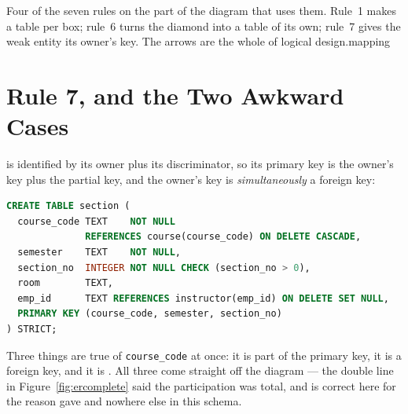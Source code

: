 {Four of the seven rules on the part of the diagram that uses them. Rule~1
makes a table per box; rule~6 turns the diamond into a table of its own;
rule~7 gives the weak entity its owner's key. The arrows are the whole of
logical design.}{mapping}

\section{Rule 7, and the Two Awkward Cases}

\begin{examplebox}
 is identified by its owner plus its discriminator, so its primary
key is the owner's key plus the partial key, and the owner's key is
\emph{simultaneously} a foreign key:

\begin{lstlisting}[language=sql]
CREATE TABLE section (
  course_code TEXT    NOT NULL
              REFERENCES course(course_code) ON DELETE CASCADE,
  semester    TEXT    NOT NULL,
  section_no  INTEGER NOT NULL CHECK (section_no > 0),
  room        TEXT,
  emp_id      TEXT REFERENCES instructor(emp_id) ON DELETE SET NULL,
  PRIMARY KEY (course_code, semester, section_no)
) STRICT;
\end{lstlisting}

\smallskip
Three things are true of \texttt{course\_code} at once: it is part of the
primary key, it is a foreign key, and it is . All three come
straight off the diagram --- the double line in Figure~\ref{fig:ercomplete}
said the participation was total, and  is correct here for the
reason  gave and nowhere else in this schema.
\end{examplebox}

